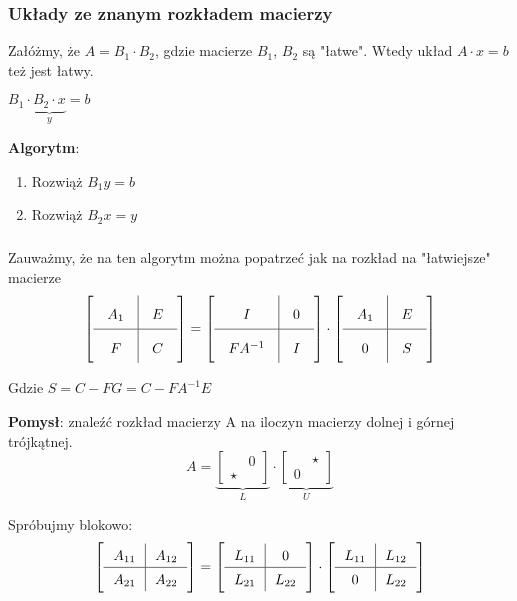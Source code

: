 \documentclass[hidelinks,a4paper,fleqn,oneside]{book}
\newcommand{\eye}{I}
\begin{document}
\subsubsection{Układy ze znanym rozkładem macierzy}

Załóżmy, że $A = B_1 \cdot B_2$, gdzie macierze $B_1$, $B_2$ są "łatwe". Wtedy układ $A\cdot x = b$ też jest łatwy.

$B_1 \cdot \underbrace{ B_2 \cdot x}_{y} = b$

\textbf{Algorytm}:

\begin{enumerate}
	\item Rozwiąż $B_1 y = b$
	\item Rozwiąż $B_2 x = y$
\end{enumerate}

\subsubsection{}

Zauważmy, że na ten algorytm można popatrzeć jak na rozkład na "łatwiejsze" macierze
\[\arraycolsep=1em\def\arraystretch{2}
	\left[
		\begin{array}{c|c}
			A_1 & E \\ \hline
			F   & C 
		\end{array}
	\right] =
	\left[
		\begin{array}{c|c}
			\eye     & 0 \\ \hline
			F A^{-1} & I 
		\end{array}
	\right]
	\cdot 
	\left[
		\begin{array}{c|c}
			A_1 & E \\ \hline
			0   & S 
		\end{array}
	\right]
\]

Gdzie $S = C - FG = C - FA^{-1}E$


\textbf{Pomysł}: znaleźć rozkład macierzy A na iloczyn macierzy dolnej i górnej trójkątnej.
\[
	A = \underbrace{\left[
			\begin{array}{cc}
				      & 0 \\
				\star &   
			\end{array}
		\right]}_{L} \cdot
	\underbrace{\left[
			\begin{array}{cc}
				  & \star \\
				0 &       
			\end{array}
		\right]}_{U}
\]

Spróbujmy blokowo:
\[\arraycolsep=0.7em\def\arraystretch{1.4}
	\left[
		\begin{array}{c|c}
			A_{11} & A_{12} \\ \hline
			A_{21} & A_{22} 
		\end{array}
	\right] =
	\left[
		\begin{array}{c|c}
			L_{11} & 0      \\ \hline
			L_{21} & L_{22} 
		\end{array}
	\right]
	\cdot 
	\left[
		\begin{array}{c|c}
			L_{11} & L_{12} \\ \hline
			0      & L_{22} 
		\end{array}
	\right]
\]
\end{document}
